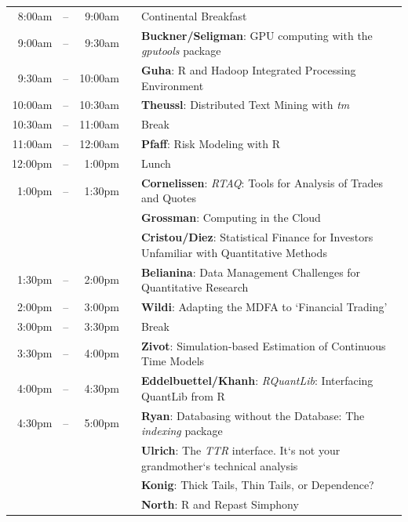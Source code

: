 \documentclass[11pt]{article}
\newcommand{\mylinecolor}[1]{\color{#1}\vspace{-8pt}}  %
\begin{document}
\begin{tabular}{rlrlp{5in}}
  8:00am  & -- &  9:00am &   & \small{\mylinecolor{Breaks} Continental Breakfast}  \\
  9:00am  & -- &  9:30am &   & \textbf{\color{Talk} Buckner/Seligman}: \small{GPU computing with the \emph{gputools} package} \\
  9:30am  & -- & 10:00am &   & \textbf{\color{Talk} Guha}: \small{R and Hadoop Integrated Processing Environment} \\
  10:00am & -- & 10:30am &   & \textbf{\color{Talk} Theussl}: \small{Distributed Text Mining with \emph{tm}} \\
  10:30am & -- & 11:00am &   & \small{\mylinecolor{Breaks}  Break}  \\
  11:00am & -- & 12:00am &   & \textbf{\color{KeynoteTalk} Pfaff}: \small{Risk Modeling with R} \\
  12:00pm & -- &  1:00pm &   & \small{\mylinecolor{Breaks}  Lunch}  \\
   1:00pm & -- &  1:30pm &   & \textbf{\color{LightningTalk} Cornelissen}: \small{\emph{RTAQ}: Tools for Analysis of Trades and Quotes} \\
          &    &         &   & \textbf{\color{LightningTalk} Grossman}: \small{Computing in the Cloud} \\
          &    &         &   & \textbf{\color{LightningTalk} Cristou/Diez}: \small{Statistical Finance for Investors Unfamiliar with Quantitative Methods} \\
  1:30pm  & -- & 2:00pm  &   & \textbf{\color{Talk} Belianina}: \small{Data Management Challenges for Quantitative Research} \\
  2:00pm  & -- & 3:00pm  &   & \textbf{\color{KeynoteTalk} Wildi}: \small{Adapting the MDFA to `Financial Trading'} \\
  3:00pm  & -- & 3:30pm  &   & \small{\mylinecolor{Breaks} Break} \\
  3:30pm  & -- & 4:00pm  &   & \textbf{\color{Talk} Zivot}: \small{Simulation-based Estimation of Continuous Time Models} \\
  4:00pm  & -- & 4:30pm  &   & \textbf{\color{Talk} Eddelbuettel/Khanh}: \small{\emph{RQuantLib}: Interfacing QuantLib from R} \\
  4:30pm  & -- & 5:00pm  &   & \textbf{\color{LightningTalk} Ryan}: \small{Databasing without the Database: The \emph{indexing} package} \\
          &    &         &   & \textbf{\color{LightningTalk} Ulrich}: \small{The \emph{TTR} interface.  It`s not your grandmother`s technical analysis} \\
          &    &         &   & \textbf{\color{LightningTalk} Konig}: \small{Thick Tails, Thin Tails, or Dependence?} \\
          &    &         &   & \textbf{\color{LightningTalk} North}: \small{R and Repast Simphony} \\
\end{tabular}
\end{document}
